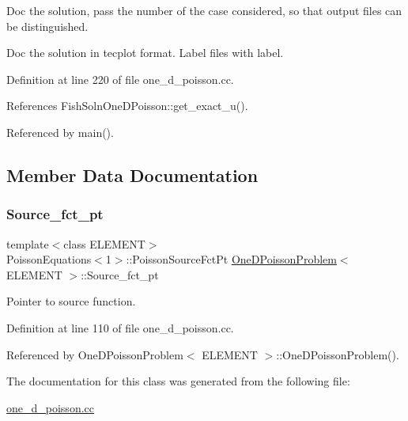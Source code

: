 Doc the solution, pass the number of the case considered, so that output files can be distinguished. 

Doc the solution in tecplot format. Label files with label. 

Definition at line 220 of file one\+\_\+d\+\_\+poisson.\+cc.



References Fish\+Soln\+One\+D\+Poisson\+::get\+\_\+exact\+\_\+u().



Referenced by main().



\subsection{Member Data Documentation}
\mbox{\label{classOneDPoissonProblem_a5fdff4b9218f56dec7fbc282f2428eef}} 
\subsubsection{\texorpdfstring{Source\+\_\+fct\+\_\+pt}{Source\_fct\_pt}}
{\footnotesize\ttfamily template$<$class E\+L\+E\+M\+E\+NT$>$ \\
Poisson\+Equations$<$1$>$\+::Poisson\+Source\+Fct\+Pt \hyperlink{classOneDPoissonProblem}{One\+D\+Poisson\+Problem}$<$ E\+L\+E\+M\+E\+NT $>$\+::Source\+\_\+fct\+\_\+pt\hspace{0.3cm}{\ttfamily [private]}}



Pointer to source function. 



Definition at line 110 of file one\+\_\+d\+\_\+poisson.\+cc.



Referenced by One\+D\+Poisson\+Problem$<$ E\+L\+E\+M\+E\+N\+T $>$\+::\+One\+D\+Poisson\+Problem().



The documentation for this class was generated from the following file\+:\begin{DoxyCompactItemize}
\item 
\hyperlink{one__d__poisson_8cc}{one\+\_\+d\+\_\+poisson.\+cc}\end{DoxyCompactItemize}

